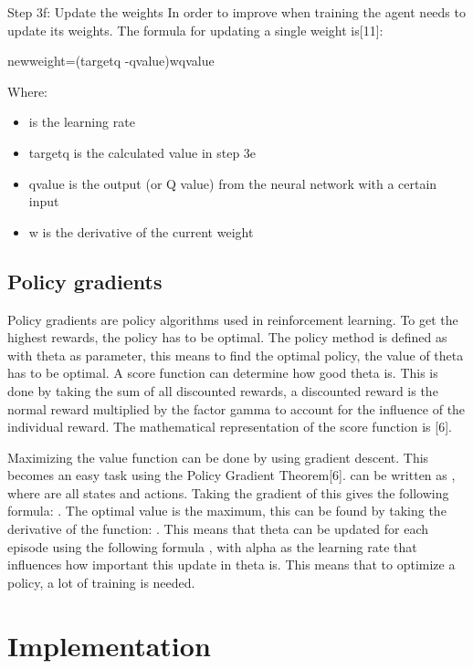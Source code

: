 \documentclass{article}
\begin{document}
\begin{flushleft}
Step 3f: Update the weights
In order to improve when training the agent needs to update its weights. The formula for updating a single weight is[11]:

newweight=(targetq -qvalue)wqvalue
\newline

Where:
\begin{itemize}
\item is the learning rate 
\item targetq is the calculated value in step 3e
\item qvalue is the output (or Q value) from the neural network with a certain input
\item w is the derivative of the current weight
\end{itemize}
\end{flushleft}

\subsection{Policy gradients}
Policy gradients are policy algorithms used in reinforcement learning. To get the highest rewards, the policy has to be optimal. The policy method is defined as  with theta as parameter, this means to find the optimal policy, the value of theta has to be optimal. A score function can determine how good theta is. This is done by taking the sum of all discounted rewards, a discounted reward is the normal reward multiplied by the factor gamma to account for the influence of the individual reward. The mathematical representation of the score function is [6]. 

\begin{flushleft}
Maximizing the value function can be done by using gradient descent. This becomes an easy task using the Policy Gradient Theorem[6].  can be written as , where  are all states and actions. Taking the gradient of this gives the following formula: . The optimal value is the maximum, this can be found by taking the derivative of the function: . This means that theta can be updated for each episode using the following formula , with alpha as the learning rate that influences how important this update in theta is. This means that to optimize a policy, a lot of training is needed.
\end{flushleft}

\section{Implementation}
\end{document}
